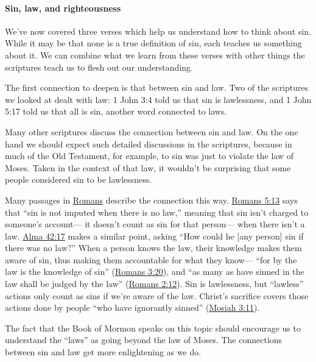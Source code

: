 		\paragraph{Sin, law, and righteousness}
		
			We've now covered three verses which help us understand how to think about sin.
			While it may be that none is a true definition of sin,
				each teaches us something about it.
			We can combine what we learn from these verses with other things the scriptures teach us to flesh out our understanding.
			
			The first connection to deepen is that between sin and law.
			Two of the scriptures we looked at dealt with law:
				1 John 3:4 told us that sin is lawlessness,
					and 1 John 5:17 told us that all  is sin,
						another word connected to laws.
			
			Many other scriptures discuss the connection between sin and law.
			On the one hand we should expect such detailed discussions in the scriptures,
				because in much of the Old Testament,
					for example,
						to sin was just to violate the law of Moses.
			Taken in the context of that law,
				it wouldn't be surprising that some people considered sin to be lawlessness.
				
			Many passages in \hyperref[ROMANS]{Romans} describe the connection this way.
			\hyperref[ROMANS-5-13]{Romans 5:13} says that ``sin is not imputed when there is no law,''
				meaning that sin isn't charged to someone's account---%
					it doesn't count as sin for that person---%
						when there isn't a law.
			\hyperref[ALMA-42-17]{Alma 42:17} makes a similar point,
				asking ``How could he [any person] sin if there was no law?''
			When a person knows the law,
				their knowledge makes them aware of sin,
					thus making them accountable for what they know---%
						``for by the law is the knowledge of sin'' (\hyperref[ROMANS-3-20]{Romans 3:20}),
							and ``as many as have sinned in the law shall be judged by the law'' (\hyperref[ROMANS-2-12]{Romans 2:12}).
			Sin is lawlessness,
				but ``lawless'' actions only count as sins if we're aware of the law.
			Christ's sacrifice covers those actions done by people ``who have ignorantly sinned'' (\hyperref[MOSIAH-3-11]{Mosiah 3:11}).
			
			The fact that the Book of Mormon speaks on this topic should encourage us to understand the ``laws'' as going beyond the law of Moses.
			The connections between sin and law get more enlightening as we do.
			
